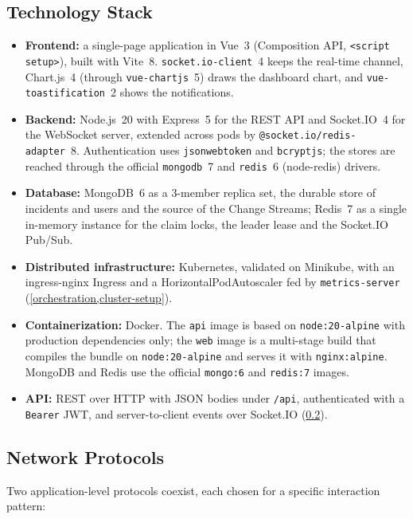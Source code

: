 \documentclass{scrartcl}
\begin{document}
\subsection{Technology Stack}\label{tech-stack}

\begin{itemize}
  \item \textbf{Frontend:} a single-page application in Vue~3 (Composition API, \texttt{<script setup>}), built with Vite~8. \texttt{socket.io-client}~4 keeps the real-time channel, Chart.js~4 (through \texttt{vue-chartjs}~5) draws the dashboard chart, and \texttt{vue-toastification}~2 shows the notifications.
  \item \textbf{Backend:} Node.js~20 with Express~5 for the REST API and Socket.IO~4 for the WebSocket server, extended across pods by \texttt{@socket.io/redis-adapter}~8. Authentication uses \texttt{jsonwebtoken} and \texttt{bcryptjs}; the stores are reached through the official \texttt{mongodb}~7 and \texttt{redis}~6 (node-redis) drivers.
  \item \textbf{Database:} MongoDB~6 as a 3-member replica set, the durable store of incidents and users and the source of the Change Streams; Redis~7 as a single in-memory instance for the claim locks, the leader lease and the Socket.IO Pub/Sub.
  \item \textbf{Distributed infrastructure:} Kubernetes, validated on Minikube, with an ingress-nginx Ingress and a HorizontalPodAutoscaler fed by \texttt{metrics-server} (\cref{orchestration,cluster-setup}).
  \item \textbf{Containerization:} Docker. The \texttt{api} image is based on \texttt{node:20-alpine} with production dependencies only; the \texttt{web} image is a multi-stage build that compiles the bundle on \texttt{node:20-alpine} and serves it with \texttt{nginx:alpine}. MongoDB and Redis use the official \texttt{mongo:6} and \texttt{redis:7} images.
  \item \textbf{API:} REST over HTTP with JSON bodies under \texttt{/api}, authenticated with a \texttt{Bearer} JWT, and server-to-client events over Socket.IO (\cref{network-protocols}).
\end{itemize}

\subsection{Network Protocols}\label{network-protocols}

Two application-level protocols coexist, each chosen for a specific interaction pattern:
\end{document}
